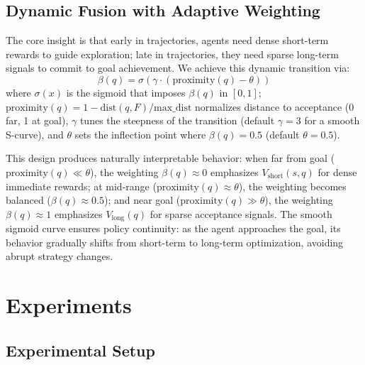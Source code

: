 \documentclass[journal]{IEEEtran}
\begin{document}
\subsection{Dynamic Fusion with Adaptive Weighting}

The core insight is that early in trajectories, agents need dense short-term rewards to guide exploration; late in trajectories, they need sparse long-term signals to commit to goal achievement. We achieve this dynamic transition via:
\begin{equation}
\beta(q) = \sigma(\gamma \cdot (\text{proximity}(q) - \theta))
\label{eq:beta_definition}
\end{equation}
where $\sigma(x)$ is the sigmoid that imposes $\beta(q)$ in $[0,1]$; $\text{proximity}(q) = 1 - {\text{dist}(q, F)}/{\text{max\_dist}}$ normalizes distance to acceptance (0 far, 1 at goal), $\gamma$ tunes the steepness of the transition (default $\gamma = 3$ for a smooth S-curve), and $\theta$ sets the inflection point where $\beta(q) = 0.5$ (default $\theta = 0.5$).

This design produces naturally interpretable behavior: when far from goal ($\text{proximity}(q) \ll \theta$), the weighting $\beta(q) \approx 0$ emphasizes $V_{\text{short}}(s,q)$ for dense immediate rewards; at mid-range ($\text{proximity}(q) \approx \theta$), the weighting becomes balanced ($\beta(q) \approx 0.5$); and near goal ($\text{proximity}(q) \gg \theta$), the weighting $\beta(q) \approx 1$ emphasizes $V_{\text{long}}(q)$ for sparse acceptance signals. The smooth sigmoid curve ensures policy continuity: as the agent approaches the goal, its behavior gradually shifts from short-term to long-term optimization, avoiding abrupt strategy changes.

\section{Experiments}
\label{sec:experiments}

\subsection{Experimental Setup}
\end{document}
